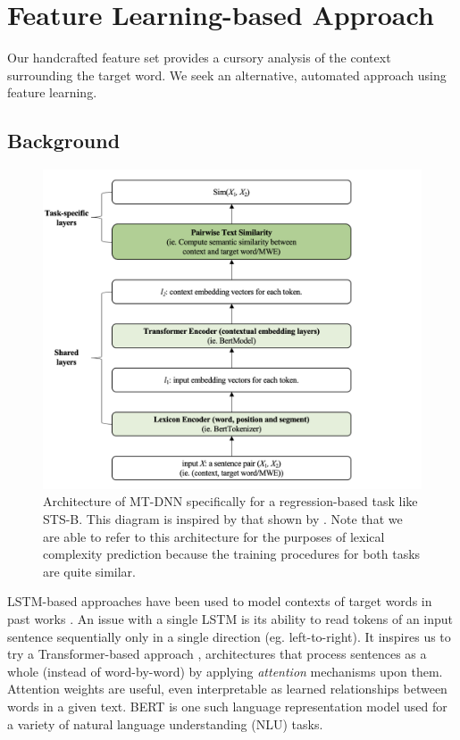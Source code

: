 \documentclass{dcthesis}
\theoremstyle{definition}
\theoremstyle{remark}
\begin{document}
\section{Feature Learning-based Approach}

Our handcrafted feature set provides a cursory analysis of the context surrounding the target word. We seek an alternative, automated approach using feature learning.

\subsection{Background}

\begin{figure}
  \centering
  \includegraphics[scale=0.75]{architecture.png}
  \caption{\label{fig:architecture} Architecture of MT-DNN specifically for a regression-based task like STS-B. This diagram is inspired by that shown by \citet{liu2019multi}. Note that we are able to refer to this architecture for the purposes of lexical complexity prediction because the training procedures for both tasks are quite similar.}
\end{figure}

LSTM-based approaches have been used to model contexts of target words in past works \citep{hartmann2018nilc, de2018deep}. An issue with a single LSTM is its ability to read tokens of an input sentence sequentially only in a single direction (eg. left-to-right). It inspires us to try a Transformer-based approach \citep{vaswani2017attention}, architectures that process sentences as a whole (instead of word-by-word) by applying \textit{attention} mechanisms upon them. Attention weights are useful, even interpretable as learned relationships between words in a given text. BERT \citep{devlin2018bert} is one such language representation model used for a variety of natural language understanding (NLU) tasks.
\end{document}
